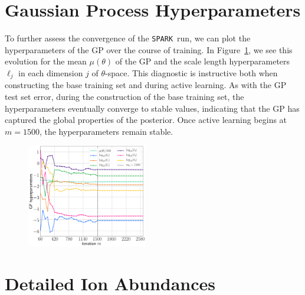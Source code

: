 \documentclass[twocolumn, twocolappendix]{aastex63}
\def\SPARK{\texttt{SPARK}}
\begin{document}
\section{Gaussian Process Hyperparameters}\label{app:GP_hparams}

To further assess the convergence of the \SPARK~run, we can plot the hyperparameters of the GP over the course of training. In Figure~\ref{fig:hparams}, we see this evolution for the mean $\mu(\theta)$ of the GP and the scale length hyperparameters $\ell_j$ in each dimension $j$ of $\theta$-space. This diagnostic is instructive both when constructing the base training set and during active learning. As with the GP test set error, during the construction of the base training set, the hyperparameters eventually converge to stable values, indicating that the GP has captured the global properties of the posterior. Once active learning begins at $m = 1500$, the hyperparameters remain stable.


\begin{figure}[!ht]
    \centering
    \includegraphics[width=0.47\textwidth]{figs/appendix/220808_014638_GP_hparams.png}
    \label{fig:hparams}
\end{figure}


\section{Detailed Ion Abundances}\label{app:ion_abunds}
\end{document}
